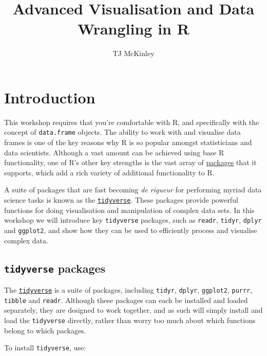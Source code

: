\documentclass[]{book}
\title{Advanced Visualisation and Data Wrangling in R}
\author{TJ McKinley}
\date{}
\theoremstyle{definition}
\theoremstyle{definition}
\theoremstyle{definition}
\theoremstyle{remark}
\begin{document}
\maketitle

{
\hypersetup{linkcolor=black}
\setcounter{tocdepth}{1}
\tableofcontents
}
\chapter*{Introduction}\label{introduction}

This workshop requires that you're comfortable with R, and specifically
with the concept of \texttt{data.frame} objects. The ability to work
with and visualise data frames is one of the key reasons why R is so
popular amongst statisticians and data scientists. Although a vast
amount can be achieved using base R functionality, one of R's other key
strengths is the vast array of
\href{https://cran.r-project.org/web/packages/}{packages} that it
supports, which add a rich variety of additional functionality to R.

A suite of packages that are fast becoming \emph{de rigueur} for
performing myriad data science tasks is known as the
\href{https://www.tidyverse.org/}{\texttt{tidyverse}}. These packages
provide powerful functions for doing visualisation and manipulation of
complex data sets. In this workshop we will introduce key
\texttt{tidyverse} packages, such as \texttt{readr}, \texttt{tidyr},
\texttt{dplyr} and \texttt{ggplot2}, and show how they can be used to
efficiently process and visualise complex data.

\section*{\texorpdfstring{\texttt{tidyverse}
packages}{tidyverse packages}}\label{tidyverse-packages}

The \href{https://www.tidyverse.org/}{\texttt{tidyverse}} is a suite of
packages, including \texttt{tidyr}, \texttt{dplyr}, \texttt{ggplot2},
\texttt{purrr}, \texttt{tibble} and \texttt{readr}. Although these
packages can each be installed and loaded separately, they are designed
to work together, and as such will simply install and load the
\texttt{tidyverse} directly, rather than worry too much about which
functions belong to which packages.

To install \texttt{tidyverse}, use:
\end{document}
